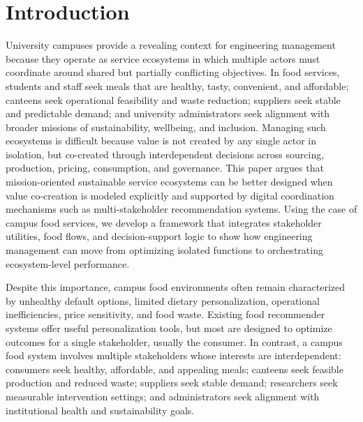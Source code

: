 \documentclass[journal]{IEEEtran}
\begin{document}
%
\IEEEpeerreviewmaketitle



\providecommand{\tightlist}{\setlength{\itemsep}{0pt}\setlength{\parskip}{0pt}}
\section{Introduction}\label{introduction}

University campuses provide a revealing context for engineering
management because they operate as service ecosystems in which multiple
actors must coordinate around shared but partially conflicting
objectives. In food services, students and staff seek meals that are
healthy, tasty, convenient, and affordable; canteens seek operational
feasibility and waste reduction; suppliers seek stable and predictable
demand; and university administrators seek alignment with broader
missions of sustainability, wellbeing, and inclusion. Managing such
ecosystems is difficult because value is not created by any single actor
in isolation, but co-created through interdependent decisions across
sourcing, production, pricing, consumption, and governance. This paper
argues that mission-oriented sustainable service ecosystems can be
better designed when value co-creation is modeled explicitly and
supported by digital coordination mechanisms such as multi-stakeholder
recommendation systems. Using the case of campus food services, we
develop a framework that integrates stakeholder utilities, food flows,
and decision-support logic to show how engineering management can move
from optimizing isolated functions to orchestrating ecosystem-level
performance.

Despite this importance, campus food environments often remain
characterized by unhealthy default options, limited dietary
personalization, operational inefficiencies, price sensitivity, and food
waste. Existing food recommender systems offer useful personalization
tools, but most are designed to optimize outcomes for a single
stakeholder, usually the consumer. In contrast, a campus food system
involves multiple stakeholders whose interests are interdependent:
consumers seek healthy, affordable, and appealing meals; canteens seek
feasible production and reduced waste; suppliers seek stable demand;
researchers seek measurable intervention settings; and administrators
seek alignment with institutional health and sustainability goals.
\end{document}
